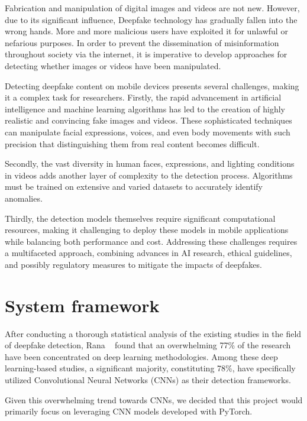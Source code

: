 \documentclass[10pt,twocolumn,letterpaper]{article}
\begin{document}
Fabrication and manipulation of digital images and videos are not new\cite{Farid2020}. However, due to its significant influence, Deepfake technology has gradually fallen into the wrong hands. More and more malicious users have exploited it for unlawful or nefarious purposes. In order to prevent the dissemination of misinformation throughout society via the internet, it is imperative to develop approaches for detecting whether images or videos have been manipulated\cite{9721302}.

Detecting deepfake content on mobile devices presents several challenges, making it a complex task for researchers. Firstly, the rapid advancement in artificial intelligence and machine learning algorithms has led to the creation of highly realistic and convincing fake images and videos. These sophisticated techniques can manipulate facial expressions, voices, and even body movements with such precision that distinguishing them from real content becomes difficult. 

Secondly, the vast diversity in human faces, expressions, and lighting conditions in videos adds another layer of complexity to the detection process. Algorithms must be trained on extensive and varied datasets to accurately identify anomalies. 

Thirdly, the detection models themselves require significant computational resources, making it challenging to deploy these models in mobile applications while balancing both performance and cost. Addressing these challenges requires a multifaceted approach, combining advances in AI research, ethical guidelines, and possibly regulatory measures to mitigate the impacts of deepfakes.


\section{System framework}
\label{sec:formatting}
After conducting a thorough statistical analysis of the existing studies in the field of deepfake detection, Rana \etal~\cite{9721302} found that an overwhelming 77\% of the research have been concentrated on deep learning methodologies. Among these deep learning-based studies, a significant majority, constituting 78\%, have specifically utilized Convolutional Neural Networks (CNNs) as their detection frameworks.

Given this overwhelming trend towards CNNs, we decided that this project would primarily focus on leveraging CNN models developed with PyTorch\cite{paszke2019pytorch}.
\end{document}

